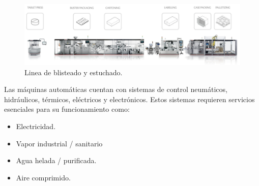 \begin{figure}[htbp]
	\centering
	\includegraphics[width=1\textwidth]{./Figures/IMA.png}
	\caption{Linea de blisteado y estuchado.}
	\label{fig:texmaker}
\end{figure}

Las máquinas automáticas cuentan con sistemas de control neumáticos, hidráulicos, térmicos, eléctricos y electrónicos. Estos sistemas requieren servicios esenciales para su funcionamiento como:
 
\begin{itemize}
	\item Electricidad.
	\item Vapor industrial / sanitario
	\item Agua helada / purificada.
	\item Aire comprimido.
\end{itemize}




 

  

%

